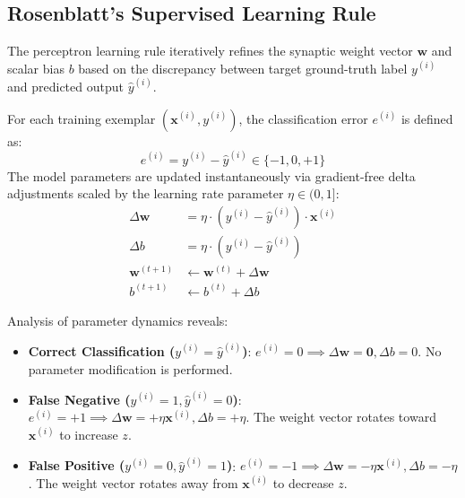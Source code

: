 \documentclass[12pt]{article}
\begin{document}
\subsection{Rosenblatt's Supervised Learning Rule}
The perceptron learning rule iteratively refines the synaptic weight vector $\mathbf{w}$ and scalar bias $b$ based on the discrepancy between target ground-truth label $y^{(i)}$ and predicted output $\hat{y}^{(i)}$.

For each training exemplar $(\mathbf{x}^{(i)}, y^{(i)})$, the classification error $e^{(i)}$ is defined as:
\begin{equation}
    e^{(i)} = y^{(i)} - \hat{y}^{(i)} \in \{-1, 0, +1\}
\end{equation}
The model parameters are updated instantaneously via gradient-free delta adjustments scaled by the learning rate parameter $\eta \in (0, 1]$:
\begin{align}
    \Delta \mathbf{w} &= \eta \cdot (y^{(i)} - \hat{y}^{(i)}) \cdot \mathbf{x}^{(i)} \\
    \Delta b &= \eta \cdot (y^{(i)} - \hat{y}^{(i)}) \\
    \mathbf{w}^{(t+1)} &\leftarrow \mathbf{w}^{(t)} + \Delta \mathbf{w} \\
    b^{(t+1)} &\leftarrow b^{(t)} + \Delta b
\end{align}

Analysis of parameter dynamics reveals:
\begin{itemize}
    \item \textbf{Correct Classification ($y^{(i)} = \hat{y}^{(i)}$)}: $e^{(i)} = 0 \implies \Delta \mathbf{w} = \mathbf{0}, \Delta b = 0$. No parameter modification is performed.
    \item \textbf{False Negative ($y^{(i)} = 1, \hat{y}^{(i)} = 0$)}: $e^{(i)} = +1 \implies \Delta \mathbf{w} = +\eta \mathbf{x}^{(i)}, \Delta b = +\eta$. The weight vector rotates toward $\mathbf{x}^{(i)}$ to increase $z$.
    \item \textbf{False Positive ($y^{(i)} = 0, \hat{y}^{(i)} = 1$)}: $e^{(i)} = -1 \implies \Delta \mathbf{w} = -\eta \mathbf{x}^{(i)}, \Delta b = -\eta$. The weight vector rotates away from $\mathbf{x}^{(i)}$ to decrease $z$.
\end{itemize}
\end{document}
